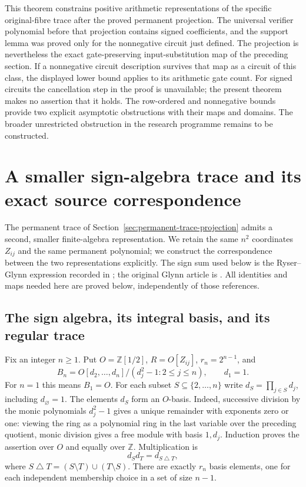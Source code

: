 This theorem constrains positive arithmetic representations of the
specific original-fibre trace after the proved permanent projection.
The universal verifier polynomial before that projection contains
signed coefficients, and the support lemma was proved only for the
nonnegative circuit just defined. The projection is nevertheless the
exact gate-preserving input-substitution map of the preceding section.
If a nonnegative circuit description survives that map as a circuit
of this class, the displayed lower bound applies to its arithmetic
gate count. For signed circuits the cancellation step in the proof
is unavailable; the present theorem makes no assertion that it holds.
The row-ordered and nonnegative bounds provide two explicit
asymptotic obstructions with their maps and domains. The broader
unrestricted obstruction in the research programme remains to be
constructed.

\section{A smaller sign-algebra trace and its exact source correspondence}
\label{sec:compressed-permanent-trace}

The permanent trace of Section~\ref{sec:permanent-trace-projection}
admits a second, smaller finite-algebra representation. We retain the
same $n^2$ coordinates $Z_{ij}$ and the same permanent polynomial;
we construct the correspondence between the two representations explicitly.
The sign sum used below is the Ryser--Glynn expression recorded in
\cite[Equation (8)]{LandsbergRessayre2017SignTrace}; the original
Glynn article is \cite{Glynn2010SignTrace}. All identities and maps
needed here are proved below, independently of those references.

\subsection{The sign algebra, its integral basis, and its regular trace}

Fix an integer $n\ge1$. Put $O=\mathbb Z[1/2]$, $R=O[Z_{ij}]$,
$r_n=2^{n-1}$, and
\[
 B_n=O[d_2,\ldots,d_n]/(d_j^2-1:2\le j\le n),\qquad d_1=1.
\]
For $n=1$ this means $B_1=O$. For each subset
$S\subseteq\{2,\ldots,n\}$ write $d_S=\prod_{j\in S}d_j$,
including $d_\varnothing=1$. The elements $d_S$ form an $O$-basis.
Indeed, successive division by the monic polynomials $d_j^2-1$
gives a unique remainder with exponents zero or one: viewing the
ring as a polynomial ring in the last variable over the preceding
quotient, monic division gives a free module with basis $1,d_j$.
Induction proves the assertion over $O$ and equally over $\mathbb Z$.
Multiplication is
\[
 d_Sd_T=d_{S\mathbin{\triangle}T},
\]
where $S\mathbin{\triangle}T=(S\setminus T)\cup(T\setminus S)$.
There are exactly $r_n$ basis elements, one for each independent
membership choice in a set of size $n-1$.

